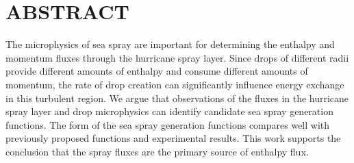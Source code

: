 \documentclass[10pt,a4paper]{article}
\begin{document}

\iffalse
from gareth
1. add scaling arguments about kinetic energy loss heating the air
2. added scaling arguments about frictional dissipation heating the air

finish the MC for the drop collisions
finish control volume analysis 
finish gamma distribution test
see if Villamaux will check 

\fi


\section{ABSTRACT}
The microphysics of sea spray are important for determining the enthalpy and momentum fluxes through the hurricane spray layer. Since drops of different radii provide different amounts of enthalpy and consume different amounts of momentum, the rate of drop creation can significantly influence energy exchange in this turbulent region. We argue that observations of the fluxes in the hurricane spray layer and drop microphysics can identify candidate sea spray generation functions. The form of the sea spray generation functions compares well with previously proposed functions and experimental results. This work supports the conclusion that the spray fluxes are the primary source of enthalpy flux.
\end{document}
